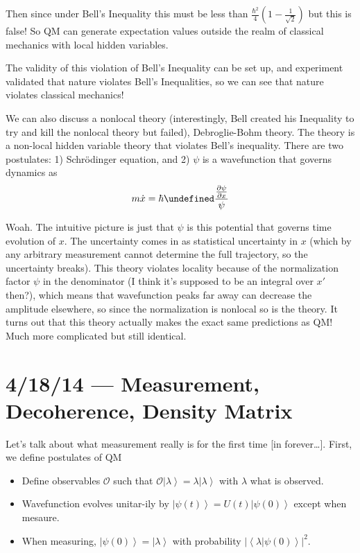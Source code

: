 \documentclass[10pt]{report}
\newcommand{\ket}[1]{\left|#1\right>}
\newcommand{\dotp}[2]{\left<#1\left.\right|#2\right>}
\newcommand{\pd}[2]{\frac{\partial #1}{\partial#2}}
\newcommand{\abs}[1]{\left|#1\right|}
\let\Im\undefined
\DeclareMathOperator{\Im}{Im}
\begin{document}
Then since under Bell's Inequality this must be less than $\frac{\hbar^2}{4}\left( 1 - \frac{1}{\sqrt{2}} \right)$ but this is false! So QM can generate expectation values outside the realm of classical mechanics with local hidden variables.

The validity of this violation of Bell's Inequality can be set up, and experiment validated that nature violates Bell's Inequalities, so we can see that nature violates classical mechanics!

We can also discuss a nonlocal theory (interestingly, Bell created his Inequality to try and kill the nonlocal theory but failed), Debroglie-Bohm theory. The theory is a non-local hidden variable theory that violates Bell's inequality. There are two postulates: 1) Schr\"odinger equation, and 2) $\psi$ is a wavefunction that governs dynamics as 
\begin{equation}
    m\dot{x} = \hbar \Im \frac{\pd{\psi}{x}}{\psi}
\end{equation}

Woah. The intuitive picture is just that $\psi$ is this potential that governs time evolution of $x$. The uncertainty comes in as statistical uncertainty in $x$ (which by any arbitrary measurement cannot determine the full trajectory, so the uncertainty breaks). This theory violates locality because of the normalization factor $\psi$ in the denominator (I think it's supposed to be an integral over $x'$ then?), which means that wavefunction peaks far away can decrease the amplitude elsewhere, so since the normalization is nonlocal so is the theory. It turns out that this theory actually makes the exact same predictions as QM! Much more complicated but still identical. 
\chapter{4/18/14 --- Measurement, Decoherence, Density Matrix}

Let's talk about what measurement really is for the first time [in forever\dots]. First, we define postulates of QM
\begin{itemize}
    \item Define observables $\mathcal{O}$ such that $\mathcal{O}\ket{\lambda} = \lambda \ket{\lambda}$ with $\lambda$ what is observed.
    \item Wavefunction evolves unitar-ily by $\ket{\psi(t)} = U(t)\ket{\psi(0)}$ except when mesaure.  
    \item When measuring, $\ket{\psi(0)} = \ket{\lambda}$ with probability $\abs{\dotp{\lambda}{\psi(0)}}^2$. 
\end{itemize}
\end{document}
